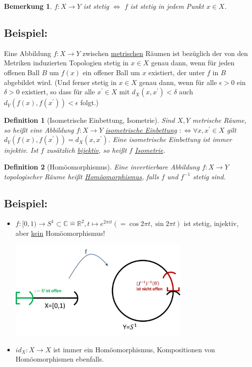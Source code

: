 \documentclass[a4paper,11pt,notitlepage]{report}
\newtheorem{definition}{Definition}[chapter]
\newtheorem{remark}{Bemerkung}[chapter]
\newcommand{\R}{{\ensuremath{\mathbb{R}}}}
\newcommand{\C}{{\ensuremath{\mathbb{C}}}}
\newenvironment{bsp}[1]
{
\setlength{\fboxsep}{10pt}
\subsection*{Beispiel: #1}
\begin{upshape}
}
{
\end{upshape}
}
\begin{document}
\begin{remark}
	$f \colon X \rightarrow Y$ ist stetig $\Leftrightarrow$ $f$ ist stetig in jedem Punkt $x \in X$.
\end{remark}

\begin{bsp}{}
	Eine Abbildung $f \colon X \rightarrow Y$ zwischen \underline{metrischen} Räumen ist bezüglich der von den Metriken induzierten Topologien stetig in $x \in X$ genau dann, wenn für jeden offenen Ball $B$ um $f(x)$ ein offener Ball um $x$ existiert, der unter $f$ in $B$ abgebildet wird. (Und ferner stetig in $x \in X$ genau dann, wenn für alle $\epsilon > 0$ ein $\delta > 0$ existiert, so dass für alle $x^\prime \in X$ mit $d_X(x,x^\prime) < \delta$ auch $d_Y \left( f(x), f(x^\prime) \right) < \epsilon$ folgt.) 
\end{bsp}

\begin{definition}[Isometrische Einbettung, Isometrie]
	Sind $X,Y$ metrische Räume, so heißt eine Abbildung $f \colon X \rightarrow Y$ \underline{isometrische Einbettung}
	\newline	
	 $: \Leftrightarrow \forall x, x^\prime \in X$ gilt $d_Y \left ( f(x), f(x^\prime) \right ) = d_X (x, x^\prime)$.
	\newline
	Eine isometrische Einbettung ist immer injektiv.
	\newline
	Ist $f$ zusätzlich \underline{bijektiv}, so heißt $f$ \underline{\underline{Isometrie}}. 
\end{definition}

\begin{definition}[Homöomorphismus]
	Eine invertierbare Abbildung $f \colon X \rightarrow Y$ topologischer Räume heißt \underline{Homöomorphismus}, falls $f$ und $f^{-1}$ stetig sind.
\end{definition}

\begin{bsp}{}
	\begin{itemize}
		\item $f \colon [0,1) \rightarrow S^1 \subset \C \hat{=} \R^2, t \mapsto e^{2 \pi i t} (= \cos {2 \pi t}, \sin {2 \pi t})$ ist stetig, injektiv, aber \underline{kein} Homöomorphismus!
		\begin{center}
		\includegraphics[width=0.7\textwidth]{images/0_1_nach_S1_f-1_nicht_stetig.jpg}
		\end{center}
		\item $id_X \colon X \rightarrow X$ ist immer ein Homöomorphismus, Kompositionen von Homöomorphismen ebenfalls.
	\end{itemize}
\end{bsp}
\end{document}
